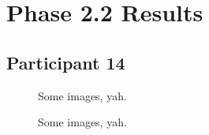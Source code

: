 \lipsum[1]


\clearpage

\section{Phase 2.2 Results}

\lipsum[1]

\lipsum[2]

\lipsum[3]


\clearpage

\subsection{Participant 14}

\begin{figure}[h]
	\caption{Some images, yah.}
\end{figure}

\lipsum[1]

\clearpage

\begin{figure}[h]
	\caption{Some images, yah.}
\end{figure}

